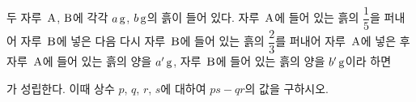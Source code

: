 두 자루~$\mathrm{A}$, $\mathrm{B}$에 각각 $a\mkern3mu \mathrm{g}$, $b\mkern3mu \mathrm{g}$의 흙이 들어 있다. 자루~$\mathrm{A}$에 들어 있는 흙의 $\dfrac{1}{5}$을 퍼내어 자루~$\mathrm{B}$에 넣은 다음 다시 자루~$\mathrm{B}$에 들어 있는 흙의 $\dfrac{2}{3}$를 퍼내어 자루~$\mathrm{A}$에 넣은 후 자루~$\mathrm{A}$에 들어 있는 흙의 양을 $a'\mkern3mu \mathrm{g}$, 자루~$\mathrm{B}$에 들어 있는 흙의 양을 $b'\mkern3mu \mathrm{g}$이라 하면\par\smallskip{}\par\smallskip\noindent 가 성립한다. 이때 상수 $p$, $q$, $r$, $s$에 대하여 $ps-qr$의 값을 구하시오.
